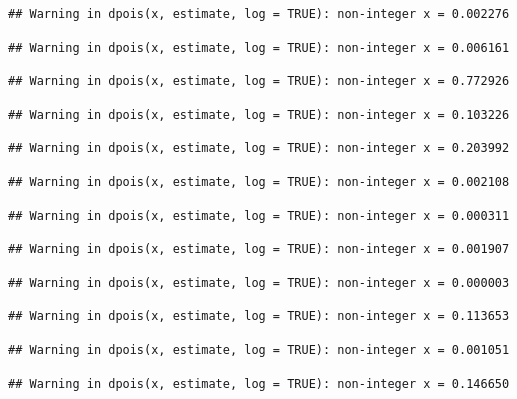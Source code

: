 \documentclass[]{article}
\begin{document}
\begin{verbatim}
## Warning in dpois(x, estimate, log = TRUE): non-integer x = 0.002276
\end{verbatim}

\begin{verbatim}
## Warning in dpois(x, estimate, log = TRUE): non-integer x = 0.006161
\end{verbatim}

\begin{verbatim}
## Warning in dpois(x, estimate, log = TRUE): non-integer x = 0.772926
\end{verbatim}

\begin{verbatim}
## Warning in dpois(x, estimate, log = TRUE): non-integer x = 0.103226
\end{verbatim}

\begin{verbatim}
## Warning in dpois(x, estimate, log = TRUE): non-integer x = 0.203992
\end{verbatim}

\begin{verbatim}
## Warning in dpois(x, estimate, log = TRUE): non-integer x = 0.002108
\end{verbatim}

\begin{verbatim}
## Warning in dpois(x, estimate, log = TRUE): non-integer x = 0.000311
\end{verbatim}

\begin{verbatim}
## Warning in dpois(x, estimate, log = TRUE): non-integer x = 0.001907
\end{verbatim}

\begin{verbatim}
## Warning in dpois(x, estimate, log = TRUE): non-integer x = 0.000003
\end{verbatim}

\begin{verbatim}
## Warning in dpois(x, estimate, log = TRUE): non-integer x = 0.113653
\end{verbatim}

\begin{verbatim}
## Warning in dpois(x, estimate, log = TRUE): non-integer x = 0.001051
\end{verbatim}

\begin{verbatim}
## Warning in dpois(x, estimate, log = TRUE): non-integer x = 0.146650
\end{verbatim}
\end{document}
